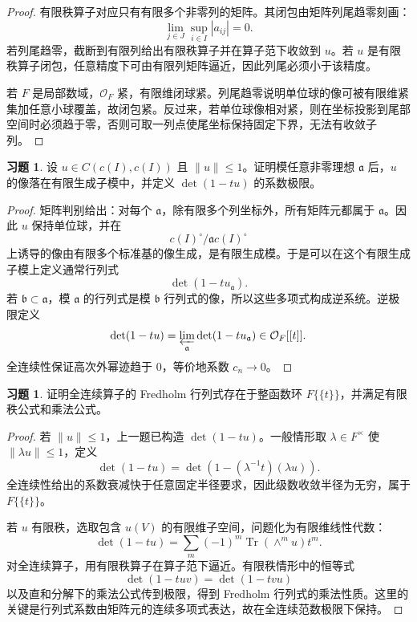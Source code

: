\documentclass[11pt,a4paper,openany]{ctexbook}
\numberwithin{equation}{chapter}
\theoremstyle{plain}
\theoremstyle{definition}
\newtheorem{exercise}[theorem]{习题}
\theoremstyle{remark}
\begin{document}
\begin{proof}
有限秩算子对应只有有限多个非零列的矩阵。其闭包由矩阵列尾趋零刻画：
\[
  \lim_{j\in J}\sup_{i\in I}|a_{ij}|=0.
\]
若列尾趋零，截断到有限列给出有限秩算子并在算子范下收敛到 $u$。若 $u$ 是有限秩算子闭包，任意精度下可由有限列矩阵逼近，因此列尾必须小于该精度。

若 $F$ 是局部数域，$\mathcal O_F$ 紧，有限维闭球紧。列尾趋零说明单位球的像可被有限维紧集加任意小球覆盖，故闭包紧。反过来，若单位球像相对紧，则在坐标投影到尾部空间时必须趋于零，否则可取一列点使尾坐标保持固定下界，无法有收敛子列。
\end{proof}

\begin{exercise}
设 $u\in C(c(I),c(I))$ 且 $\|u\|\le1$。证明模任意非零理想 $\mathfrak a$ 后，$u$ 的像落在有限生成子模中，并定义 $\det(1-tu)$ 的系数极限。
\end{exercise}

\begin{proof}
矩阵判别给出：对每个 $\mathfrak a$，除有限多个列坐标外，所有矩阵元都属于 $\mathfrak a$。因此 $u$ 保持单位球，并在
\[
  c(I)^\circ/\mathfrak a c(I)^\circ
\]
上诱导的像由有限多个标准基的像生成，是有限生成模。于是可以在这个有限生成子模上定义通常行列式
\[
  \det(1-tu_{\mathfrak a}).
\]
若 $\mathfrak b\subset\mathfrak a$，模 $\mathfrak a$ 的行列式是模 $\mathfrak b$ 行列式的像，所以这些多项式构成逆系统。逆极限定义
\[
  \det(1-tu)=\varprojlim_{\mathfrak a}\det(1-tu_{\mathfrak a})\in\mathcal O_F[[t]].
\]
全连续性保证高次外幂迹趋于 $0$，等价地系数 $c_n\to0$。
\end{proof}

\begin{exercise}
证明全连续算子的 Fredholm 行列式存在于整函数环 $F\{\{t\}\}$，并满足有限秩公式和乘法公式。
\end{exercise}

\begin{proof}
若 $\|u\|\le1$，上一题已构造 $\det(1-tu)$。一般情形取 $\lambda\in F^\times$ 使 $\|\lambda u\|\le1$，定义
\[
  \det(1-tu)=\det(1-(\lambda^{-1}t)(\lambda u)).
\]
全连续性给出的系数衰减快于任意固定半径要求，因此级数收敛半径为无穷，属于 $F\{\{t\}\}$。

若 $u$ 有限秩，选取包含 $u(V)$ 的有限维子空间，问题化为有限维线性代数：
\[
  \det(1-tu)=\sum_m(-1)^m\operatorname{Tr}(\wedge^m u)t^m.
\]
对全连续算子，用有限秩算子在算子范下逼近。有限秩情形中的恒等式
\[
  \det(1-tuv)=\det(1-tvu)
\]
以及直和分解下的乘法公式传到极限，得到 Fredholm 行列式的乘法性质。这里的关键是行列式系数由矩阵元的连续多项式表达，故在全连续范数极限下保持。
\end{proof}
\end{document}

